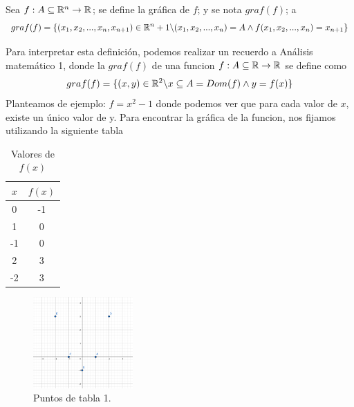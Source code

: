 
\begin{definition} [Grafica de $f$] 
\label{def:grafica}
 \mbox{}
 
Sea $f: A\subseteq\mathbb{R}^n\rightarrow\mathbb{R}$; se define la gráfica de $f$; y se nota $graf(f)$; a
 \[
graf(f)=\{(x_1,x_2,...,x_n,x_{n+1})\in\mathbb{R}^n+1 \backslash (x_1,x_2,...,x_n)=A \land f(x_1,x_2,...,x_n)=x_{n+1} \}
 \]

Para interpretar esta definición, podemos realizar un recuerdo a Análisis matemático 1, donde la $graf (f)$ de una funcion $f: A\subseteq\mathbb{R}\rightarrow\mathbb{R}$ se define como
 \[
graf(f)=\{(x,y)\in\mathbb{R}^2 \backslash x\subseteq A=Dom(f) \land y=f(x) \}
 \]
Planteamos de ejemplo: $f=x^2-1$ donde podemos ver que para cada valor de $x$, existe un único valor de y. Para encontrar la gráfica de la funcion, nos fijamos utilizando la siguiente tabla
\begin{table}[h!]
\centering
\begin{tabular}{|c|c|}
\hline
\textbf{$x$} & \textbf{$f(x)$}  \\ \hline
0             & -1                         \\ \hline
1             & 0                        \\ \hline
-1             & 0                          \\ \hline
2             & 3                          \\ \hline
-2             & 3                          \\ \hline
\end{tabular}
\caption{Valores de $f(x)$}
\label{tabla1}
\end{table}
\begin{figure}[h!] %
    \centering
    \includegraphics[width=0.34\textwidth]{../figs/Puntos_grafica.png} %
    \caption{Puntos de tabla 1.}
    \label{fig:ejemplo1} %
\end{figure}



\end{definition}

